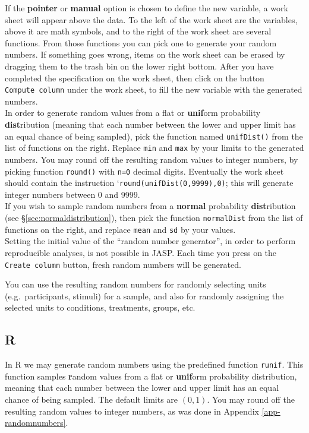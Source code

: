 \documentclass[
]{book}
\begin{document}
If the \textbf{pointer} or \textbf{manual} option is chosen to define the new variable, a work sheet will appear above the data. To the left of the work sheet are the variables, above it are math symbols, and to the right of the work sheet are several functions. From those functions you can pick one to generate your random numbers. If something goes wrong, items on the work sheet can be erased by dragging them to the trash bin on the lower right bottom. After you have completed the specification on the work sheet, then click on the button \texttt{Compute\ column} under the work sheet, to fill the new variable with the generated numbers.\\
In order to generate random values from a flat or \textbf{unif}orm probability \textbf{dist}ribution (meaning that each number between the lower and upper limit has an equal chance of being sampled), pick the function named \texttt{unifDist()} from the list of functions on the right. Replace \texttt{min} and \texttt{max} by your limits to the generated numbers. You may round off the resulting random values to integer numbers, by picking function \texttt{round()} with \texttt{n=0} decimal digits. Eventually the work sheet should contain the instruction `\texttt{round(unifDist(0,9999),0)}; this will generate integer numbers between 0 and 9999.\\
If you wish to sample random numbers from a \textbf{normal} probability \textbf{dist}ribution (see §\ref{sec:normaldistribution}), then pick the function \texttt{normalDist} from the list of functions on the right, and replace \texttt{mean} and \texttt{sd} by your values.\\

Setting the initial value of the ``random number generator'', in order to perform reproducible analyses, is not possible in JASP. Each time you press on the \texttt{Create\ column} button, fresh random numbers will be generated.

You can use the resulting random numbers for randomly selecting units (e.g.~participants, stimuli) for a sample, and also for randomly assigning the selected units to conditions, treatments, groups, etc.

\subsection{R}\label{r}

In R we may generate random numbers using the predefined function \texttt{runif}.
This function samples \textbf{r}andom values from a flat or \textbf{unif}orm probability distribution, meaning that each number between the lower and upper limit has an equal chance of being sampled. The default limits are \((0,1)\). You may round off the resulting random values to integer numbers, as was done in Appendix \ref{app-randomnumbers}.
\end{document}
